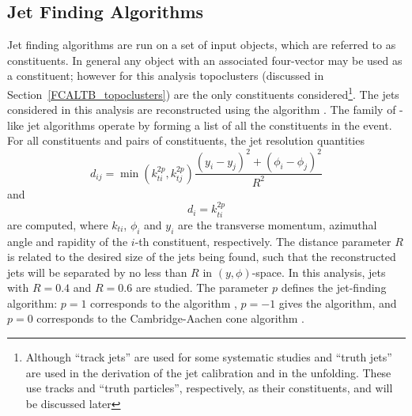 \subsection{Jet Finding Algorithms}
\label{incjets_jetfinding}
Jet finding algorithms are run on a set of input objects, which are referred to as constituents. In general any object with an associated four-vector may be used as a constituent; however for this analysis topoclusters (discussed in Section~\ref{FCALTB_topoclusters}) are the only constituents considered\footnote{ Although ``track jets'' are used for some systematic studies and ``truth jets'' are used in the derivation of the jet calibration and in the unfolding. These use tracks and ``truth particles'', respectively, as their constituents, and will be discussed later}. The jets considered in this analysis are reconstructed using the \akt algorithm \cite{Cacciari:2008gp}. The family of \kt-like jet algorithms operate by forming a list of all the constituents in the event. For all constituents and pairs of constituents, the jet resolution quantities 
\begin{equation}
d_{ij} = \min(k_{ti}^{2p},k_{tj}^{2p}) \frac{(y_i - y_j)^2 + (\phi_i - \phi_j)^2}{R^2}
\end{equation}
and
\begin{equation}
d_i  = k_{ti}^{2p}
\end{equation}
are computed, where $k_{ti}$, $\phi_i$ and $y_i$ are the transverse momentum, azimuthal angle and rapidity of the $i$-th constituent, respectively. The distance parameter $R$ is related to the desired size of the jets being found, such that the reconstructed jets will be separated by no less than $R$ in $(y,\phi)$-space. In this analysis, jets with $R =0.4$ and $R=0.6$ are studied. The parameter $p$ defines the jet-finding algorithm: $p=1$ corresponds to the \kt algorithm \cite{Catani1993187}, $p=-1$ gives the \akt algorithm, and $p=0$ corresponds to the Cambridge-Aachen cone algorithm \cite{CA_cone}. %


